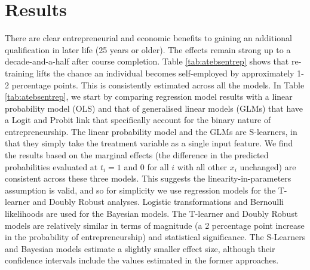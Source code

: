 \documentclass[12pt, a4paper]{article}
\begin{document}
\section{Results}

There are clear entrepreneurial and economic benefits to gaining an additional
qualification in later life (25 years or older). The effects remain strong up
to a decade-and-a-half after course completion. Table \ref{tab:atebsentrep}
shows that re-training lifts the chance an individual becomes self-employed by
approximately 1-2 percentage points. This is consistently estimated across all
the models. In Table \ref{tab:atebsentrep}, we start by comparing regression
model results with a linear probability model (OLS) and that of generalised
linear models (GLMs) that have a Logit and Probit link that specifically
account for the binary nature of entrepreneurship. The linear probability model
and the GLMs are S-learners, in that they simply take the treatment variable as
a single input feature. We find the results based on the marginal effects (the
difference in the predicted probabilities evaluated at $t_i = 1$ and $0$ for
all $i$ with all other $x_i$ unchanged) are consistent across these three
models. This suggests the linearity-in-parameters assumption is valid, and so
for simplicity we use regression models for the T-learner and Doubly Robust
analyses. Logistic transformations and Bernoulli likelihoods are used for the
Bayesian models. The T-learner and Doubly Robust models are relatively similar
in terms of magnitude (a 2 percentage point increase in the probability of
entrepreneurship) and statistical significance. The S-Learners and Bayesian
models estimate a slightly smaller effect size, although their confidence
intervals include the values estimated in the former approaches.
\end{document}
